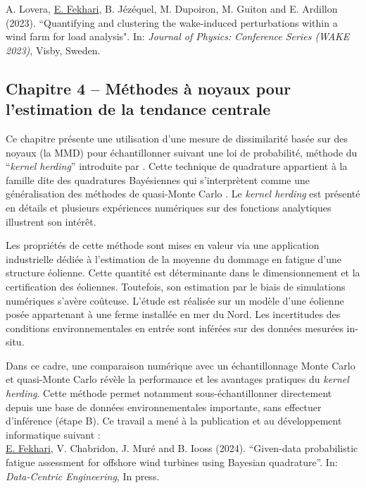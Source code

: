\noindent
{} A. Lovera, \underline{E. Fekhari}, B. Jézéquel, M. Dupoiron, M. Guiton and E. Ardillon (2023). ``Quantifying and clustering the wake-induced perturbations within a wind farm for load analysis". In: \textit{Journal of Physics: Conference Series (WAKE 2023)}, Visby, Sweden. 

\subsection*{Chapitre 4 -- Méthodes à noyaux pour l'estimation de la tendance centrale}

Ce chapitre présente une utilisation d'une mesure de dissimilarité basée sur des noyaux (la MMD) pour échantillonner suivant une loi de probabilité, méthode du ``\textit{kernel herding}'' introduite par \citet{chen_welling_2010}. 
Cette technique de quadrature appartient à la famille dite des \og quadratures Bayésiennes \fg{} \citep{briol_oates_2019} qui s'interprètent comme une généralisation des méthodes de quasi-Monte Carlo \citep{hickernell_2020}. 
Le \textit{kernel herding} est présenté en détails et plusieurs expériences numériques sur des fonctions analytiques illustrent son intérêt. 

Les propriétés de cette méthode sont mises en valeur via une application industrielle dédiée à l'estimation de la moyenne du dommage en fatigue d'une structure éolienne. 
Cette quantité est déterminante dans le dimensionnement et la certification des éoliennes. 
Toutefois, son estimation par le biais de simulations numériques s'avère coûteuse. 
L'étude est réalisée sur un modèle d'une éolienne posée appartenant à une ferme installée en mer du Nord. 
Les incertitudes des conditions environnementales en entrée sont inférées sur des données mesurées in-situ. 

Dans ce cadre, une comparaison numérique avec un échantillonnage Monte Carlo et quasi-Monte Carlo révèle la performance et les avantages pratiques du \textit{kernel herding}.
Cette méthode permet notamment sous-échantillonner directement depuis une base de données environnementales importante, sans effectuer d'inférence (étape B). 
Ce travail a mené à la publication et au développement informatique suivant : \\

\noindent
{} \underline{E. Fekhari}, V. Chabridon, J. Muré and B. Iooss (2024). ``Given-data probabilistic fatigue assessment for offshore wind turbines using Bayesian quadrature''. In: \textit{Data-Centric Engineering}, In press.\\

